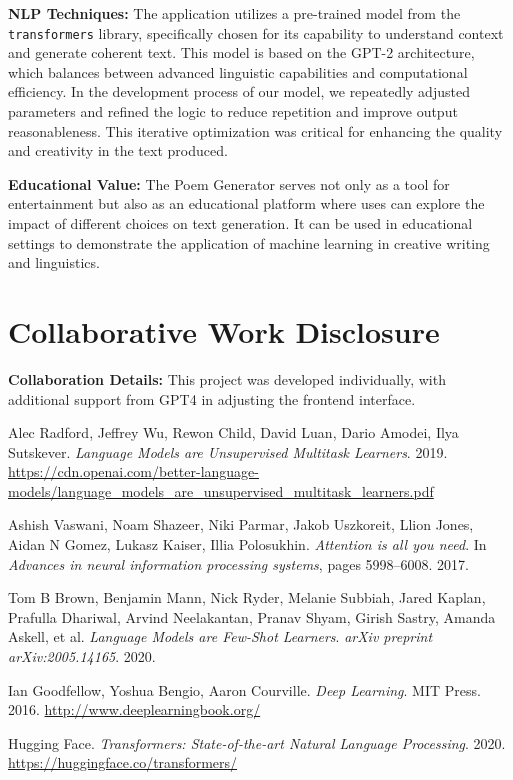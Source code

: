 \documentclass[11pt]{article}
\begin{document}
\textbf{NLP Techniques:} The application utilizes a pre-trained model from the \texttt{transformers} library, specifically chosen for its capability to understand context and generate coherent text. This model is based on the GPT-2 architecture, which balances between advanced linguistic capabilities and computational efficiency. In the development process of our model, we repeatedly adjusted parameters and refined the logic to reduce repetition and improve output reasonableness. This iterative optimization was critical for enhancing the quality and creativity in the text produced. 

\textbf{Educational Value:} The Poem Generator serves not only as a tool for entertainment but also as an educational platform where uses can explore the impact of different choices on text generation. It can be used in educational settings to demonstrate the application of machine learning in creative writing and linguistics.

\section{Collaborative Work Disclosure}

\textbf{Collaboration Details:} This project was developed individually, with additional support from GPT4 in adjusting the frontend interface.

\begin{thebibliography}{99}

Alec Radford, Jeffrey Wu, Rewon Child, David Luan, Dario Amodei, Ilya Sutskever.
\textit{Language Models are Unsupervised Multitask Learners}.
2019.
\url{https://cdn.openai.com/better-language-models/language_models_are_unsupervised_multitask_learners.pdf}

Ashish Vaswani, Noam Shazeer, Niki Parmar, Jakob Uszkoreit, Llion Jones, Aidan N Gomez, Lukasz Kaiser, Illia Polosukhin.
\textit{Attention is all you need}.
In \textit{Advances in neural information processing systems}, pages 5998--6008.
2017.

Tom B Brown, Benjamin Mann, Nick Ryder, Melanie Subbiah, Jared Kaplan, Prafulla Dhariwal, Arvind Neelakantan, Pranav Shyam, Girish Sastry, Amanda Askell, et al.
\textit{Language Models are Few-Shot Learners}.
\textit{arXiv preprint arXiv:2005.14165}.
2020.

Ian Goodfellow, Yoshua Bengio, Aaron Courville.
\textit{Deep Learning}.
MIT Press.
2016.
\url{http://www.deeplearningbook.org/}

Hugging Face.
\textit{Transformers: State-of-the-art Natural Language Processing}.
2020.
\url{https://huggingface.co/transformers/}

\end{thebibliography}
\end{document}
